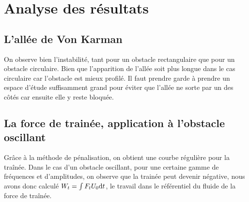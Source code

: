 \section{Analyse des résultats}

	\subsection{L'allée de Von Karman}
	
		On observe bien l'instabilité, tant pour un obstacle rectangulaire que pour un obstacle circulaire. Bien que l'apparition de l'allée soit plus longue dans le cas circulaire car l'obstacle est mieux profilé. Il faut prendre garde à prendre un espace d'étude suffisamment grand pour éviter que l'allée ne sorte par un des côtés car ensuite elle y reste bloquée.
	
	\subsection{La force de trainée, application à l'obstacle oscillant}
	
		Grâce à la méthode de pénalisation, on obtient une courbe régulière pour la traînée. Dans le cas d'un obstacle oscillant, pour une certaine gamme de fréquences et d'amplitudes, on observe que la trainée peut devenir négative, nous avons donc calculé $W_t= \int F_t U_0\mathrm{d}t$, le travail dans le référentiel du fluide de la force de traînée.

	
	
	
		


	
